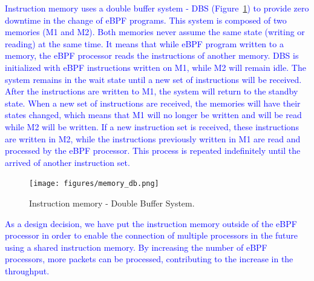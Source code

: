 \textcolor{blue}{Instruction memory uses a double buffer system - DBS (Figure~\ref{fig:mem_db}) to provide zero downtime in the change of eBPF programs. This system is composed of two memories (M1 and M2). Both memories never assume the same state (writing or reading) at the same time. It means that while eBPF program written to a memory, the eBPF processor reads the instructions of another memory. DBS is initialized with eBPF instructions written on M1, while M2 will remain idle. The system remains in the wait state until a new set of instructions will be received. After the instructions are written to M1, the system will return to the standby state. When a new set of instructions are received, the memories will have their states changed, which means that M1 will no longer be written and will be read while M2 will be written. If a new instruction set is received, these instructions are written in M2, while the instructions previously written in M1 are read and processed by the eBPF processor. This process is repeated indefinitely until the arrived of another instruction set.} 

\begin{figure}[ht]
\centering
\texttt{[image: figures/memory\_db.png]}
\caption{Instruction memory - Double Buffer System.}
\label{fig:mem_db}
\end{figure}

\textcolor{blue}{As a design decision, we have put the instruction memory outside of the eBPF processor in order to enable the connection of multiple processors in the future using a shared instruction memory. By increasing the number of eBPF processors, more packets can be processed, contributing to the increase in the throughput.}


